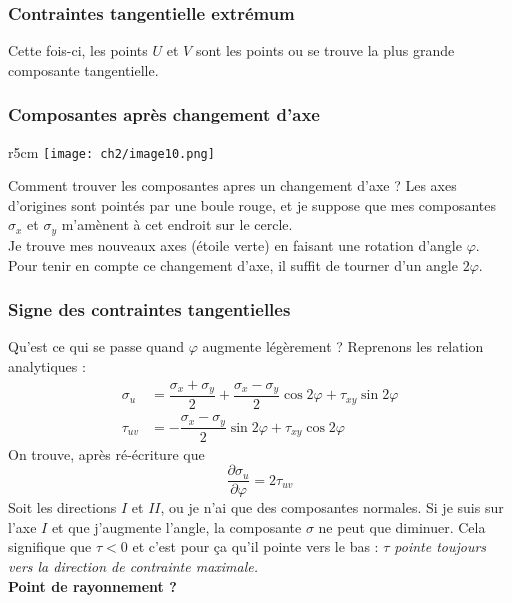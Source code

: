     \subsubsection{Contraintes tangentielle extrémum}
    Cette fois-ci, les points $U$ et $V$ sont les points ou se trouve la plus grande composante tangentielle.
    
    \subsubsection{Composantes après changement d'axe}
    \begin{wrapfigure}[7]{r}{5cm}
    \texttt{[image: ch2/image10.png]}
    \end{wrapfigure}
    Comment trouver les composantes apres un changement d'axe ? Les axes d'origines sont pointés par une boule
    rouge, et je suppose que mes composantes $\sigma_x$ et $\sigma_y$ m'amènent à cet endroit sur le cercle.\\
    
    Je trouve mes nouveaux axes (étoile verte) en faisant une rotation d'angle $\varphi$. Pour tenir en compte
    ce changement d'axe, il suffit de tourner d'un angle $2\varphi$.
    
    \subsubsection{Signe des contraintes tangentielles}

    Qu'est ce qui se passe quand $\varphi$ augmente légèrement ? Reprenons les relation analytiques :
    \begin{equation}
    \begin{array}{ll}
    \sigma_u &= \dfrac{\sigma_x+\sigma_y}{2} + \dfrac{\sigma_x-\sigma_y}{2}\cos 2\varphi + \tau_{xy}\sin
    2\varphi\\
    \tau_{uv} &= -\dfrac{\sigma_x-\sigma_y}{2}\sin 2\varphi + \tau_{xy}\cos 2\varphi
    \end{array}
    \end{equation}       
    On trouve, après ré-écriture que 
    \begin{equation}
    \frac{\partial \sigma_u}{\partial \varphi} = 2\tau_{uv}
    \end{equation}
    Soit les directions $I$ et $II$, ou je n'ai que des composantes normales. Si je suis sur l'axe $I$ et que
    j'augmente l'angle, la composante $\sigma$ ne peut que diminuer. Cela signifique que $\tau < 0$ et c'est
    pour ça qu'il pointe vers le bas : \textit{$\tau$ pointe toujours vers la direction de contrainte maximale.}
    \\ \textbf{Point de rayonnement ?}
    
